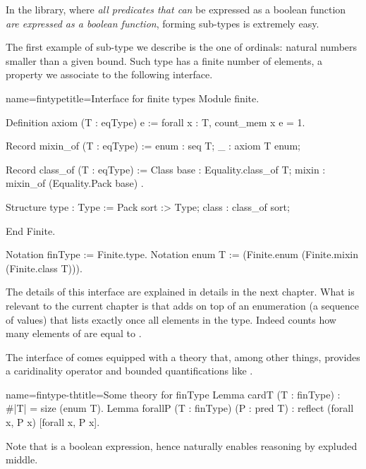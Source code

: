 In the \mcbMC{} library, where \emph{all predicates that can} be
expressed as a boolean function \emph{are expressed as a boolean
function}, forming sub-types is extremely easy.

\mcbLEARN{}
\mcbNOTES{}

The first example of sub-type we describe is the one of ordinals:
natural numbers smaller than a given bound.  Such type has a finite
number of elements, a property we associate to the following
interface.

\begin{coq}{name=fintype}{title=Interface for finite types}
Module finite.

Definition axiom (T : eqType) e :=
  forall x : T, count_mem x e = 1.

Record mixin_of (T : eqType) := {
  enum : seq T;
  _ : axiom T enum;
}

Record class_of (T : eqType) := Class {
  base : Equality.class_of T;
  mixin : mixin_of (Equality.Pack base)
}.

Structure type : Type := Pack {
  sort :> Type;
  class : class_of sort;
}

End Finite.

Notation finType := Finite.type.
Notation enum T := (Finite.enum (Finite.mixin (Finite.class T))).
\end{coq}

The details of this interface are explained in details in the next
chapter.  What is relevant to the current chapter is that 
adds on top of  an enumeration (a sequence of values) that
lists exactly once all elements in the type.  Indeed 
counts how many elements of  are equal to .

The interface of  comes equipped with a theory that, among
other things, provides a caridinality operator  and bounded
quantifications like \C{[forall x, P]}.

\begin{coq}{name=fintype-th}{title=Some theory for finType}
Lemma cardT (T : finType) : #|T| = size (enum T).
Lemma forallP (T : finType) (P : pred T) :
  reflect (forall x, P x) [forall x, P x].
\end{coq}

Note that \C{[forall x, P x]} is a boolean expression, hence naturally
enables reasoning by expluded middle.

